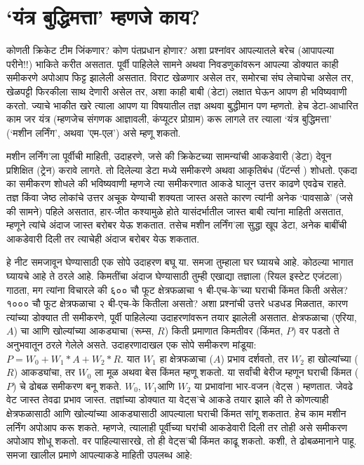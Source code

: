 \chapter{`यंत्र बुद्धिमत्ता' म्हणजे काय?}
कोणती क्रिकेट टीम जिंकणार? कोण पंतप्रधान होणार?  अशा प्रश्नांवर आपल्यातले बरेच (आपापल्या परीने!!) भाकिते करीत असतात. पूर्वी पाहिलेले सामने अथवा निवडणुकांवरून आपल्या डोक्यात काही समीकरणे अपोआप फिट्ट झालेली असतात. विराट खेळणार असेल तर, समोरचा संघ लेचापेचा असेल तर, खेळपट्टी फिरकीला साथ देणारी असेल तर, अशा काही बाबी (डेटा) लक्षात घेऊन आपण ही भविष्यवाणी करतो. ज्याचे भाकीत खरे त्याला आपण या विषयातील तज्ञ अथवा बुद्धीमान पण म्हणतो. हेच डेटा-आधारित  काम जर यंत्र (म्हणजेच संगणक आज्ञावली, कंप्यूटर प्रोग्राम) करू लागले तर त्याला `यंत्र बुद्धिमत्ता' (`मशीन लर्निंग', अथवा 'एम-एल') असे म्हणू शकतो.

मशीन लर्निंग'ला पूर्वीची माहिती, उदाहरणे, जसे की क्रिकेटच्या सामन्यांची आकडेवारी (डेटा) देवून प्रशिक्षित (ट्रेन) करावे लागते. तो दिलेल्या डेटा मध्ये समीकरणे अथवा आकृतिबंध (पॅटर्न्स ) शोधतो. एकदा का समीकरण शोधले की भविष्यवाणी म्हणजे त्या समीकरणात आकडे घालून उत्तर काढणे एवढेच राहते. तज्ञ किंवा जेष्ठ लोकांचे उत्तर अचूक येण्याची शक्यता जास्त असते कारण त्यांनी अनेक `पावसाळे' (जसे की सामने) पहिले असतात, हार-जीत कश्यामुळे होते यासंदर्भातील जास्त बाबी त्यांना माहिती असतात, म्हणूने त्यांचे अंदाज जास्त बरोबर येऊ शकतात. तसेच मशीन लर्निंग'ला सुद्धा खूप डेटा, अनेक बाबींची आकडेवारी दिली तर त्याचेही अंदाज बरोबर येऊ शकतात.

हे नीट समजावून घेण्यासाठी एक सोपे उदाहरण बघू या. समजा तुम्हाला घर घ्यायचे आहे. कोठल्या भागात घ्यायचे आहे ते ठरले आहे. किमतींचा अंदाज घेण्यासाठी तुम्ही एखाद्या तज्ञाला (रियल इस्टेट एजंटला) गाठता, मग त्यांना विचारले की ६०० चौ फूट क्षेत्रफळाचा १  बी-एच-के'च्या घराची किंमत किती असेल? १००० चौ फूट क्षेत्रफळाचा २   बी-एच-के कितीला असतो? अशा प्रश्नांची उत्तरे धडधड मिळतात, कारण त्यांच्या डोक्यात ती समीकरणे, पूर्वी पाहिलेल्या उदाहरणांवरून तयार झालेली असतात. क्षेत्रफळाचा (एरिया, $A$) चा आणि खोल्यांच्या आकड्याचा (रूम्स, $R$) किती प्रमाणात किमतीवर (किंमत, $P$) वर पडतो ते अनुभवातून ठरले गेलेले असते. उदाहरणादाखल एक सोपे समीकरण मांडूया: $P = W_0 + W_1 * A + W_2 * R$. यात $W_1$ हा क्षेत्रफळाचा ($A$) प्रभाव दर्शवतो, तर $W_2$ हा खोल्यांच्या ($R$) आकड्यांचा, तर $W_0$ ला मूळ अथवा बेस किंमत म्हणू शकतो. या सर्वांची बेरीज म्हणून घराची किंमत ($P$) चे ढोबळ समीकरण बनू शकते. $W_0$, $W_1 $आणि $W_2$ या प्रभावांना  भार-वजन  (वेट्स ) म्हणतात. जेवढे वेट जास्त तेवढा प्रभाव जास्त. तज्ञांच्या डोक्यात या वेट्स'चे आकडे तयार झाले की ते कोणत्याही क्षेत्रफळासाठी आणि खोल्यांच्या आकड्यासाठी आपल्याला घराची किंमत सांगू शकतात. हेच काम मशीन लर्निंग अपोआप करू शकते. म्हणजे, त्यालाही पूर्वीच्या घरांची आकडेवारी दिली तर तोही असे समीकरण अपोआप शोधू शकतो. वर पाहिल्यासारखे, तो ही वेट्स'ची किंमत काढू शकतो. कशी, ते ढोबळमानाने पाहू. समजा खालील प्रमाणे आपल्याकडे माहिती उपलब्ध आहे:

